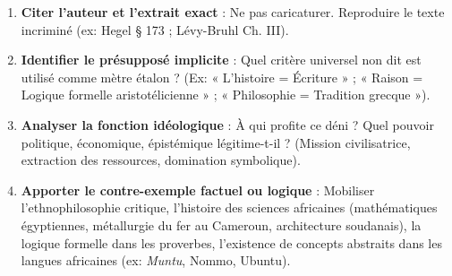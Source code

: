 \documentclass[11pt]{article}
\newcommand{\cle}[1]{{\popxbold\color{popdark}#1}}
\begin{document}
\begin{methode}
\begin{enumerate}
    \item \textbf{Citer l'auteur et l'extrait exact} : Ne pas caricaturer. Reproduire le texte incriminé (ex: Hegel § 173 ; Lévy-Bruhl Ch. III).
    \item \textbf{Identifier le présupposé implicite} : Quel critère universel non dit est utilisé comme mètre étalon ? (Ex: « L'histoire = Écriture » ; « Raison = Logique formelle aristotélicienne » ; « Philosophie = Tradition grecque »).
    \item \textbf{Analyser la fonction idéologique} : À qui profite ce déni ? Quel pouvoir politique, économique, épistémique légitime-t-il ? (Mission civilisatrice, extraction des ressources, domination symbolique).
    \item \textbf{Apporter le contre-exemple factuel ou logique} : Mobiliser l'ethnophilosophie critique, l'histoire des sciences africaines (mathématiques égyptiennes, métallurgie du fer au Cameroun, architecture soudanais), la logique formelle dans les proverbes, l'existence de concepts abstraits dans les langues africaines (ex: \emph{Muntu}, \cle{Nommo}, \cle{Ubuntu}).
\end{enumerate}
\end{methode}
\end{document}
